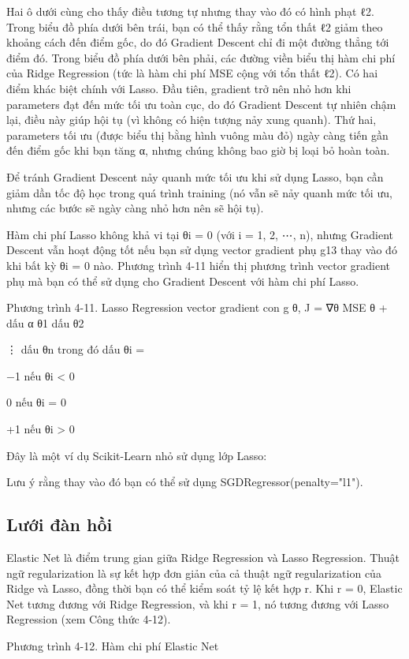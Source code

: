 Hai ô dưới cùng cho thấy điều tương tự nhưng thay vào đó có hình phạt ℓ2. Trong biểu đồ phía dưới bên trái, bạn có thể thấy rằng tổn thất ℓ2 giảm theo khoảng cách đến điểm gốc, do đó Gradient Descent chỉ đi một đường thẳng tới điểm đó. Trong biểu đồ phía dưới bên phải, các đường viền biểu thị hàm chi phí của Ridge Regression (tức là hàm chi phí MSE cộng với tổn thất ℓ2). Có hai điểm khác biệt chính với Lasso. Đầu tiên, gradient trở nên nhỏ hơn khi parameters đạt đến mức tối ưu toàn cục, do đó Gradient Descent tự nhiên chậm lại, điều này giúp hội tụ (vì không có hiện tượng nảy xung quanh). Thứ hai, parameters tối ưu (được biểu thị bằng hình vuông màu đỏ) ngày càng tiến gần đến điểm gốc khi bạn tăng α, nhưng chúng không bao giờ bị loại bỏ hoàn toàn.

Để tránh Gradient Descent nảy quanh mức tối ưu khi sử dụng Lasso, bạn cần giảm dần tốc độ học trong quá trình training (nó vẫn sẽ nảy quanh mức tối ưu, nhưng các bước sẽ ngày càng nhỏ hơn nên sẽ hội tụ).

Hàm chi phí Lasso không khả vi tại θi = 0 (với i = 1, 2, ⋯, n), nhưng Gradient Descent vẫn hoạt động tốt nếu bạn sử dụng vector gradient phụ g13 thay vào đó khi bất kỳ θi = 0 nào. Phương trình 4-11 hiển thị phương trình vector gradient phụ mà bạn có thể sử dụng cho Gradient Descent với hàm chi phí Lasso.

Phương trình 4-11. Lasso Regression vector gradient con g θ, J = ∇θ MSE θ + dấu α θ1 dấu θ2

⋮ dấu θn trong đó dấu θi =

−1 nếu θi < 0

0 nếu θi = 0

+1 nếu θi > 0

Đây là một ví dụ Scikit-Learn nhỏ sử dụng lớp Lasso:

Lưu ý rằng thay vào đó bạn có thể sử dụng SGDRegressor(penalty="l1").

\subsection{Lưới đàn hồi}

Elastic Net là điểm trung gian giữa Ridge Regression và Lasso Regression. Thuật ngữ regularization là sự kết hợp đơn giản của cả thuật ngữ regularization của Ridge và Lasso, đồng thời bạn có thể kiểm soát tỷ lệ kết hợp r. Khi r = 0, Elastic Net tương đương với Ridge Regression, và khi r = 1, nó tương đương với Lasso Regression (xem Công thức 4-12).

Phương trình 4-12. Hàm chi phí Elastic Net

